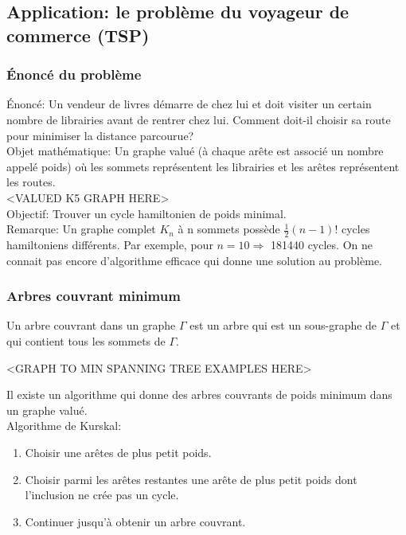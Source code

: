 \subsection{Application: le problème du voyageur de commerce (TSP)}

\subsubsection{Énoncé du problème}

Énoncé: Un vendeur de livres démarre de chez lui et doit visiter un certain nombre de librairies avant de rentrer chez lui. Comment doit-il choisir sa route pour minimiser la distance parcourue? \\ 

Objet mathématique: Un graphe valué (à chaque arête est associé un nombre appelé poids) où les sommets représentent les librairies et les arêtes représentent les routes.\\

<VALUED K5 GRAPH HERE>\\

Objectif: Trouver un cycle hamiltonien de poids minimal.\\

Remarque: Un graphe complet $K_{n}$ à n sommets possède $\frac{1}{2}(n-1)!$ cycles hamiltoniens différents. Par exemple, pour $n=10 \Rightarrow$ 181440 cycles. On ne connait pas encore d'algorithme efficace qui donne une solution au problème.\\

\subsubsection{Arbres couvrant minimum}

\begin{defn}
Un arbre couvrant dans un graphe $\Gamma$ est un arbre qui est un sous-graphe de $\Gamma$ et qui contient tous les sommets de $\Gamma$.\\
\end{defn}

\begin{exmp}
<GRAPH TO MIN SPANNING TREE EXAMPLES HERE>\\
\end{exmp}

Il existe un algorithme qui donne des arbres couvrants de poids minimum dans un graphe valué.\\

Algorithme de Kurskal:
\begin{enumerate}[i]
	\item Choisir une arêtes de plus petit poids.
	\item Choisir parmi les arêtes restantes une arête de plus petit poids dont l'inclusion ne crée pas un cycle.
	\item Continuer jusqu'à obtenir un arbre couvrant.\\
\end{enumerate}


